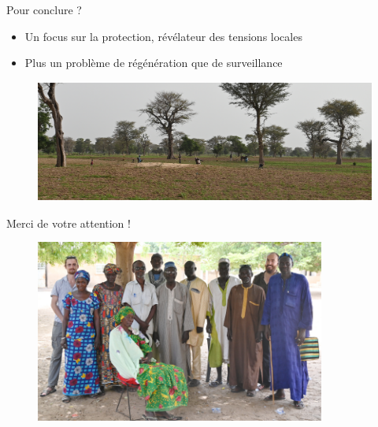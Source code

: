 \documentclass[aspectratio=169]{beamer}
\begin{document}
\begin{frame}{Pour conclure ? }
    \begin{itemize}
        \item Un focus sur la protection, révélateur des tensions locales
        \item Plus un problème de régénération que de surveillance
    \end{itemize}
    \begin{figure}
        \centering
        \includegraphics[height = 4cm]{img/end.JPG}
    \end{figure}
\end{frame}

\begin{frame}{Merci de votre attention !}
    \begin{figure}
        \centering
        \includegraphics[height = 6cm]{img/photo_groupe.JPG}
    \end{figure}
\end{frame}
\end{document}

